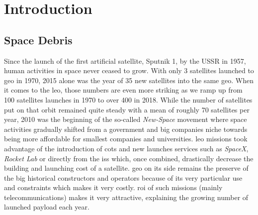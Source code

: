 \chapter{Introduction}
\label{cha:intro}

\section{Space Debris}
\label{intro:space_debris}
Since the launch of the first artificial satellite, Sputnik 1, by the USSR in 1957, human activities in space never ceased to grow. With only 3 satellites launched to \Gls{geo} in 1970, 2015 alone was the year of 35 new satellites into the same \gls{geo}. When it comes to the \Gls{leo}, those numbers are even more striking as we ramp up from 100 satellites launches in 1970 to over 400 in 2018. While the number of satellites put on that orbit remained quite steady with a mean of roughly 70 satellites per year, 2010 was the beginning of the so-called \emph{New-Space} movement where space activities gradually shifted from a government and big companies niche towards being more affordable for smallest companies and universities. \gls{leo} missions took advantage of the introduction of \Gls{cots} and new launches services such as \emph{SpaceX}, \emph{Rocket Lab} or directly from the \Gls{iss} which, once combined, drastically decrease the building and launching cost of a satellite. \gls{geo} on its side remains the preserve of the big historical constructors and operators because of its very particular use and constraints which makes it very costly. \Gls{roi} of such missions (mainly telecommunications) makes it very attractive, explaining the growing number of launched payload each year.


